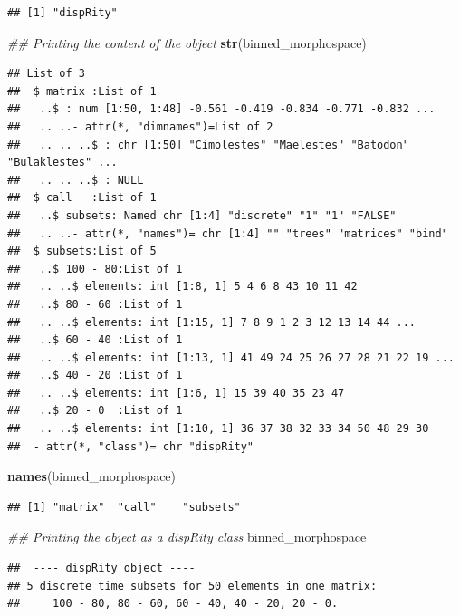 \documentclass[]{book}
\newenvironment{Shaded}{\begin{snugshade}}{\end{snugshade}}
\newcommand{\CommentTok}[1]{\textcolor[rgb]{0.56,0.35,0.01}{\textit{#1}}}
\newcommand{\KeywordTok}[1]{\textcolor[rgb]{0.13,0.29,0.53}{\textbf{#1}}}
\newcommand{\NormalTok}[1]{#1}
\begin{document}
\begin{verbatim}
## [1] "dispRity"
\end{verbatim}

\begin{Shaded}
\begin{Highlighting}[]
\CommentTok{## Printing the content of the object}
\KeywordTok{str}\NormalTok{(binned_morphospace)}
\end{Highlighting}
\end{Shaded}

\begin{verbatim}
## List of 3
##  $ matrix :List of 1
##   ..$ : num [1:50, 1:48] -0.561 -0.419 -0.834 -0.771 -0.832 ...
##   .. ..- attr(*, "dimnames")=List of 2
##   .. .. ..$ : chr [1:50] "Cimolestes" "Maelestes" "Batodon" "Bulaklestes" ...
##   .. .. ..$ : NULL
##  $ call   :List of 1
##   ..$ subsets: Named chr [1:4] "discrete" "1" "1" "FALSE"
##   .. ..- attr(*, "names")= chr [1:4] "" "trees" "matrices" "bind"
##  $ subsets:List of 5
##   ..$ 100 - 80:List of 1
##   .. ..$ elements: int [1:8, 1] 5 4 6 8 43 10 11 42
##   ..$ 80 - 60 :List of 1
##   .. ..$ elements: int [1:15, 1] 7 8 9 1 2 3 12 13 14 44 ...
##   ..$ 60 - 40 :List of 1
##   .. ..$ elements: int [1:13, 1] 41 49 24 25 26 27 28 21 22 19 ...
##   ..$ 40 - 20 :List of 1
##   .. ..$ elements: int [1:6, 1] 15 39 40 35 23 47
##   ..$ 20 - 0  :List of 1
##   .. ..$ elements: int [1:10, 1] 36 37 38 32 33 34 50 48 29 30
##  - attr(*, "class")= chr "dispRity"
\end{verbatim}

\begin{Shaded}
\begin{Highlighting}[]
\KeywordTok{names}\NormalTok{(binned_morphospace)}
\end{Highlighting}
\end{Shaded}

\begin{verbatim}
## [1] "matrix"  "call"    "subsets"
\end{verbatim}

\begin{Shaded}
\begin{Highlighting}[]
\CommentTok{## Printing the object as a dispRity class}
\NormalTok{binned_morphospace}
\end{Highlighting}
\end{Shaded}

\begin{verbatim}
##  ---- dispRity object ---- 
## 5 discrete time subsets for 50 elements in one matrix:
##     100 - 80, 80 - 60, 60 - 40, 40 - 20, 20 - 0.
\end{verbatim}
\end{document}
